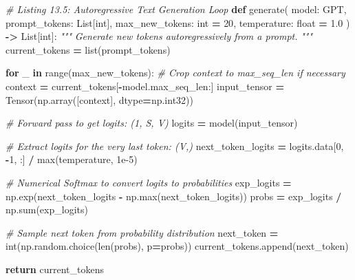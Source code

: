 \documentclass[
  letterpaper,
]{scrbook}
\newenvironment{Shaded}{\begin{snugshade}}{\end{snugshade}}
\newcommand{\BuiltInTok}[1]{#1}
\newcommand{\CommentTok}[1]{\textcolor[rgb]{0.56,0.35,0.01}{\textit{#1}}}
\newcommand{\ControlFlowTok}[1]{\textcolor[rgb]{0.13,0.29,0.53}{\textbf{#1}}}
\newcommand{\DecValTok}[1]{\textcolor[rgb]{0.00,0.00,0.81}{#1}}
\newcommand{\FloatTok}[1]{\textcolor[rgb]{0.00,0.00,0.81}{#1}}
\newcommand{\KeywordTok}[1]{\textcolor[rgb]{0.13,0.29,0.53}{\textbf{#1}}}
\newcommand{\NormalTok}[1]{#1}
\newcommand{\OperatorTok}[1]{\textcolor[rgb]{0.81,0.36,0.00}{\textbf{#1}}}
\begin{document}
\begin{Shaded}
\begin{Highlighting}[]
\CommentTok{\# Listing 13.5: Autoregressive Text Generation Loop}
\KeywordTok{def}\NormalTok{ generate(}
\NormalTok{    model: GPT,}
\NormalTok{    prompt\_tokens: List[}\BuiltInTok{int}\NormalTok{],}
\NormalTok{    max\_new\_tokens: }\BuiltInTok{int} \OperatorTok{=} \DecValTok{20}\NormalTok{,}
\NormalTok{    temperature: }\BuiltInTok{float} \OperatorTok{=} \FloatTok{1.0}
\NormalTok{) }\OperatorTok{{-}\textgreater{}}\NormalTok{ List[}\BuiltInTok{int}\NormalTok{]:}
    \CommentTok{"""}
\CommentTok{    Generate new tokens autoregressively from a prompt.}
\CommentTok{    """}
\NormalTok{    current\_tokens }\OperatorTok{=} \BuiltInTok{list}\NormalTok{(prompt\_tokens)}

    \ControlFlowTok{for}\NormalTok{ \_ }\KeywordTok{in} \BuiltInTok{range}\NormalTok{(max\_new\_tokens):}
        \CommentTok{\# Crop context to max\_seq\_len if necessary}
\NormalTok{        context }\OperatorTok{=}\NormalTok{ current\_tokens[}\OperatorTok{{-}}\NormalTok{model.max\_seq\_len:]}
\NormalTok{        input\_tensor }\OperatorTok{=}\NormalTok{ Tensor(np.array([context], dtype}\OperatorTok{=}\NormalTok{np.int32))}

        \CommentTok{\# Forward pass to get logits: (1, S, V)}
\NormalTok{        logits }\OperatorTok{=}\NormalTok{ model(input\_tensor)}

        \CommentTok{\# Extract logits for the very last token: (V,)}
\NormalTok{        next\_token\_logits }\OperatorTok{=}\NormalTok{ logits.data[}\DecValTok{0}\NormalTok{, }\OperatorTok{{-}}\DecValTok{1}\NormalTok{, :] }\OperatorTok{/} \BuiltInTok{max}\NormalTok{(temperature, }\FloatTok{1e{-}5}\NormalTok{)}

        \CommentTok{\# Numerical Softmax to convert logits to probabilities}
\NormalTok{        exp\_logits }\OperatorTok{=}\NormalTok{ np.exp(next\_token\_logits }\OperatorTok{{-}}\NormalTok{ np.}\BuiltInTok{max}\NormalTok{(next\_token\_logits))}
\NormalTok{        probs }\OperatorTok{=}\NormalTok{ exp\_logits }\OperatorTok{/}\NormalTok{ np.}\BuiltInTok{sum}\NormalTok{(exp\_logits)}

        \CommentTok{\# Sample next token from probability distribution}
\NormalTok{        next\_token }\OperatorTok{=} \BuiltInTok{int}\NormalTok{(np.random.choice(}\BuiltInTok{len}\NormalTok{(probs), p}\OperatorTok{=}\NormalTok{probs))}
\NormalTok{        current\_tokens.append(next\_token)}

    \ControlFlowTok{return}\NormalTok{ current\_tokens}
\end{Highlighting}
\end{Shaded}
\end{document}
